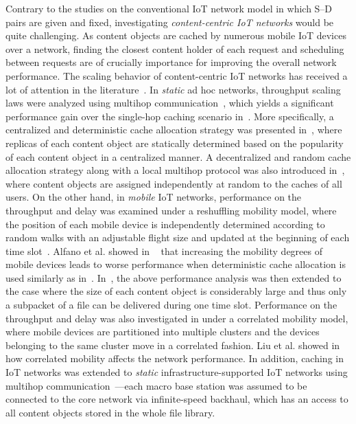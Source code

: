 \documentclass[10pt,journal,compsoc,onecolumn]{IEEEtran}
\begin{document}
Contrary to the studies on the conventional IoT network model
in which S--D pairs are given and fixed, investigating
\textit{content-centric IoT networks} would be quite
challenging. As content objects are cached by numerous mobile IoT devices over
a network, finding the closest content holder of each request and
scheduling between requests are of crucially importance for
improving the overall network performance. The scaling behavior of
content-centric IoT networks has received a lot of attention in
the literature~\cite{c2,Ji_IT,c5,c3,a1,XLiu}. In \textit{static} ad
hoc networks, throughput scaling laws were analyzed using multihop
communication~\cite{c2,c5}, which yields a significant performance
gain over the single-hop caching scenario
in~\cite{singlehop,Ji_IT}. More specifically, a centralized and
deterministic cache allocation strategy was presented
in~\cite{c2}, where replicas of each content object are statically
determined based on the popularity of each content object in a
centralized manner. A decentralized and random cache allocation
strategy along with a local multihop protocol was also introduced
in~\cite{c5}, where content objects are assigned independently at
random to the caches of all users. On the other hand, in
\textit{mobile} IoT networks, performance on the throughput and
delay was examined under a reshuffling mobility model, where the
position of each mobile device is independently determined according to
random walks with an adjustable flight size and updated at the
beginning of each time slot~\cite{c3}. Alfano et al. showed in ~\cite{c3}
that increasing the mobility degrees of mobile devices leads to worse
performance when deterministic cache allocation is used similarly
as in~\cite{c2}. In~\cite{Adeel}, the above performance analysis was then extended to the case where the size of each content object is considerably large and thus
only a subpacket of a file can be delivered during one time slot.
Performance on the throughput and delay was also investigated in \cite{XLiu} under a correlated mobility model, where mobile devices are partitioned into multiple clusters and the devices belonging to the same cluster move in a correlated fashion. Liu et al. showed in \cite{XLiu} how correlated mobility affects the network performance. In addition, caching in IoT networks was extended to {\em static} infrastructure-supported IoT networks using multihop communication~\cite{acc3,a1}---each macro base station was assumed to be connected to the core network via infinite-speed backhaul, which has an access to all content objects stored in the
whole file library.
\end{document}
